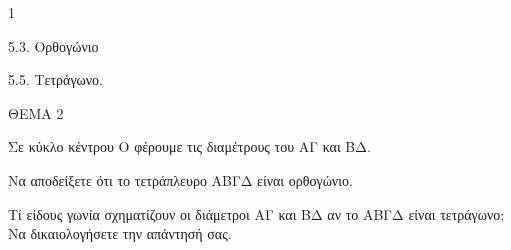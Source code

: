 \begin{ylh}{1}
    \item 5.3. Ορθογώνιο
    \item 5.5. Τετράγωνο.
\end{ylh}

ΘΕΜΑ 2

Σε κύκλο κέντρου Ο φέρουμε τις διαμέτρους του ΑΓ και ΒΔ.

\begin{alist}
\item Να αποδείξετε ότι το τετράπλευρο ΑΒΓΔ είναι ορθογώνιο. 

\item Τί είδους γωνία σχηματίζουν οι διάμετροι ΑΓ και ΒΔ αν το ΑΒΓΔ είναι τετράγωνο; Να δικαιολογήσετε την απάντησή σας. 
\end{alist}

